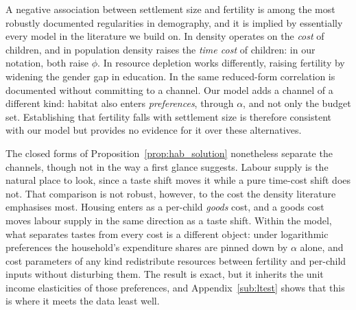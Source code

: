 \documentclass[11pt]{article}
\begin{document}
A negative association between settlement size and fertility is among the most robustly documented
regularities in demography, and it is implied by essentially every model in the literature we build
on. In \citet{DAO2013442} density operates on the \emph{cost} of children, and in \citet{dao25} population
density raises the \emph{time cost} of children: in our notation, both raise $\phi$. In \citet{dao25}
resource depletion works differently, raising fertility by widening the gender gap in education. In \citet{DELACROIX201713} the same reduced-form
correlation is documented without committing to a channel. Our model adds a channel of a different kind:
habitat also enters \emph{preferences}, through $\alpha$, and not only the budget set. Establishing that fertility
falls with settlement size is therefore consistent with our model but provides no evidence for it
over these alternatives.

The closed forms of Proposition~\ref{prop:hab_solution} nonetheless separate the channels, though
not in the way a first glance suggests. Labour supply is the natural place to look, since a taste
shift moves it while a pure time-cost shift does not. That comparison is not robust, however, to
the cost the density literature emphasises most. Housing enters as a per-child \emph{goods} cost,
and a goods cost moves labour supply in the same direction as a taste shift. Within the model, what
separates tastes from every cost is a different object: under logarithmic preferences the
household's expenditure shares are pinned down by $\alpha$ alone, and cost parameters of any kind
redistribute resources between fertility and per-child inputs without disturbing them. The result
is exact, but it inherits the unit income elasticities of those preferences, and
Appendix~\ref{sub:ltest} shows that this is where it meets the data least well.
\end{document}
